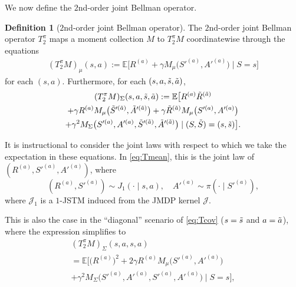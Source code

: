 \documentclass[accepted]{uai2026}
\theoremstyle{plain}
\theoremstyle{definition}
\newtheorem{definition}[theorem]{Definition}
\theoremstyle{remark}
\newcommand{\E}{\mathbb{E}}
\newcommand{\1}{\mathbbm{1}}
\begin{document}
We now define the $2$nd-order joint Bellman operator.

\begin{definition}[$2$nd-order joint Bellman operator] The $2$nd-order joint Bellman operator $T^\pi_2$ maps a moment collection $M$ to $T^\pi_2M$ coordinatewise through the equations
\begin{equation}\label{eq:Tmean}
\begin{gathered}
(T^\pi_2M)_\mu(s, a) := \E\big[ R^{(a)} + \gamma M_\mu\big(S'^{(a)}, A'^{(a)}\big) \mid S= s\big]
\end{gathered}
\end{equation}
for each $(s, a)$. Furthermore, for each $(s, a, \Tilde{s},\Tilde{a})$,
\begin{equation}\label{eq:Tcov}
\begin{gathered}
(T^\pi_2 M)_\Sigma(s, a, \Tilde{s}, \Tilde{a}) := \E \big[R^{(a)}\Tilde{R}^{(\Tilde{a})}\\+\gamma R^{(a)} M_\mu\big(\Tilde{S}'^{(\Tilde{a})},\Tilde{A}'^{(\Tilde{a})}\big)+  \gamma \Tilde{R}^{(\Tilde{a})} M_\mu\big(S'^{(a)},A'^{(a)}\big) \\+ \gamma^2 M_\Sigma\big(S'^{(a)}, A'^{(a)}, \Tilde{S}'^{(\Tilde{a})}, \Tilde{A}'^{(\Tilde{a})}\big)  \mid (S, \Tilde{S}) = (s, \Tilde{s}) \big].
\end{gathered}
\end{equation}
\end{definition}
It is instructional to consider the joint laws with respect to which we take the expectation in these equations. In \eqref{eq:Tmean}, this is the joint law of $(R^{(a)}, S'^{(a)}, A'^{(a)})$, where
\begin{equation}
(R^{(a)}, S'^{(a)}) \sim J_1(\cdot \mid s, a),\quad A'^{(a)} \sim \pi(\cdot\mid S'^{(a)}),
\end{equation}
where $\mathcal{J}_1$ is a $1$-JSTM induced from the JMDP kernel $\mathcal{J}$.

This is also the case in the ``diagonal'' scenario of \eqref{eq:Tcov} ($s = \Tilde{s}$ and $a = \Tilde{a}$), where the expression simplifies to
\begin{equation}
\begin{gathered}
(T^\pi_2 M)_\Sigma(s, a, s, a) \\ = \E\big[\big( R^{(a)}\big)^2+2\gamma R^{(a)}M_\mu\big(S'^{(a)}, A'^{(a)}\big) \\+ \gamma^2 M_\Sigma\big(S'^{(a)}, A'^{(a)}, S'^{(a)}, A'^{(a)}\big) \mid S = s \big],
\end{gathered}
\end{equation} 
\end{document}
